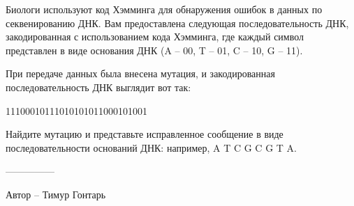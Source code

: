 \question
Биологи используют код Хэмминга для обнаружения ошибок в данных по секвенированию ДНК. Вам предоставлена следующая последовательность ДНК, закодированная с использованием кода Хэмминга, где каждый символ представлен в виде основания ДНК (A -- 00, T -- 01, C -- 10, G -- 11).

При передаче данных была внесена мутация, и закодированная последовательность ДНК выглядит вот так: 
\begin{center}
11100010111010101011000101001
\end{center}

Найдите мутацию и представьте исправленное сообщение в виде последовательности оснований ДНК: например, A T C G C G T A.

---------------

Автор -- Тимур Гонтарь